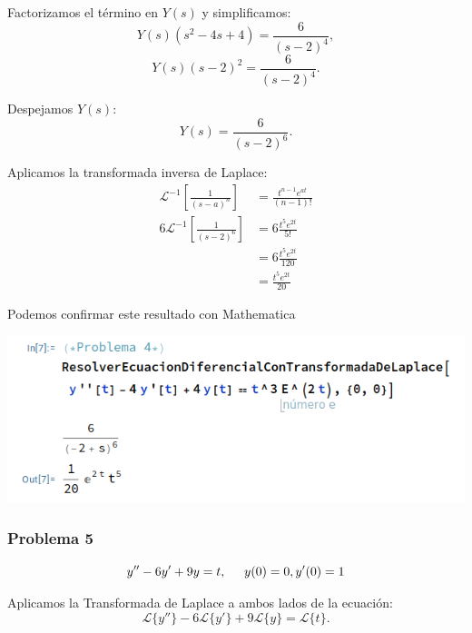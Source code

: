 \documentclass{article}
\begin{document}
Factorizamos el término en \(Y(s)\) y simplificamos:
\begin{equation*}
    Y(s)(s^2 - 4s + 4) = \frac{6}{(s-2)^4},
\end{equation*}
\begin{equation*}
    Y(s)(s - 2)^2 = \frac{6}{(s-2)^4}.
\end{equation*}

Despejamos \(Y(s)\):
\begin{equation*}
    Y(s) = \frac{6}{(s-2)^6}.
\end{equation*}

Aplicamos la transformada inversa de Laplace:
\begin{align*}
    \mathcal{L}^{-1}\left[\frac{1}{(s-a)^n}\right]  & = \frac{t^{n-1}e^{at}}{(n-1)!} \\
    6\mathcal{L}^{-1}\left[\frac{1}{(s-2)^6}\right] & = 6\frac{t^{5}e^{2t}}{5!}      \\
                                                    & = 6\frac{t^{5}e^{2t}}{120}     \\
                                                    & = \frac{t^{5}e^{2t}}{20}
\end{align*}

Podemos confirmar este resultado con Mathematica

\begin{center}
    \includegraphics[width=1\textwidth]{../../ED 2/image4.png}
\end{center}


\newpage


\subsubsection{Problema 5}

\[y'' - 6y' + 9y = t, \hspace{.5cm} y(0) = 0, y'(0) = 1\]

Aplicamos la Transformada de Laplace a ambos lados de la ecuación:
\[
    \mathcal{L}\{y''\} - 6\mathcal{L}\{y'\} + 9\mathcal{L}\{y\} = \mathcal{L}\{t\}.
\]
\end{document}
